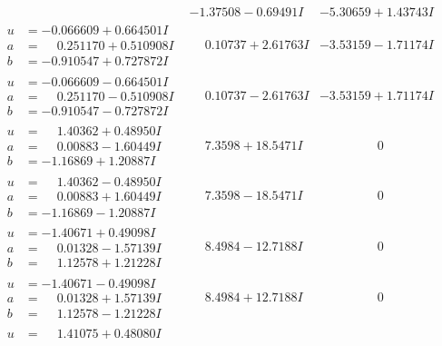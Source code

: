 \documentclass[1p]{elsarticle_modified}
\theoremstyle{definition}
\begin{document}
$$\begin{array}{c|c|c}
 & -1.37508 - 0.69491 I & -5.30659 + 1.43743 I \\ \hline\begin{aligned}
u &= -0.066609 + 0.664501 I \\
a &= \phantom{-}0.251170 + 0.510908 I \\
b &= -0.910547 + 0.727872 I\end{aligned}
 & \phantom{-}0.10737 + 2.61763 I & -3.53159 - 1.71174 I \\ \hline\begin{aligned}
u &= -0.066609 - 0.664501 I \\
a &= \phantom{-}0.251170 - 0.510908 I \\
b &= -0.910547 - 0.727872 I\end{aligned}
 & \phantom{-}0.10737 - 2.61763 I & -3.53159 + 1.71174 I \\ \hline\begin{aligned}
u &= \phantom{-}1.40362 + 0.48950 I \\
a &= \phantom{-}0.00883 - 1.60449 I \\
b &= -1.16869 + 1.20887 I\end{aligned}
 & \phantom{-}7.3598 + 18.5471 I & \phantom{-0.000000 } 0 \\ \hline\begin{aligned}
u &= \phantom{-}1.40362 - 0.48950 I \\
a &= \phantom{-}0.00883 + 1.60449 I \\
b &= -1.16869 - 1.20887 I\end{aligned}
 & \phantom{-}7.3598 - 18.5471 I & \phantom{-0.000000 } 0 \\ \hline\begin{aligned}
u &= -1.40671 + 0.49098 I \\
a &= \phantom{-}0.01328 - 1.57139 I \\
b &= \phantom{-}1.12578 + 1.21228 I\end{aligned}
 & \phantom{-}8.4984 - 12.7188 I & \phantom{-0.000000 } 0 \\ \hline\begin{aligned}
u &= -1.40671 - 0.49098 I \\
a &= \phantom{-}0.01328 + 1.57139 I \\
b &= \phantom{-}1.12578 - 1.21228 I\end{aligned}
 & \phantom{-}8.4984 + 12.7188 I & \phantom{-0.000000 } 0 \\ \hline\begin{aligned}
u &= \phantom{-}1.41075 + 0.48080 I \\

\end{aligned}
\end{array}$$
\end{document}
